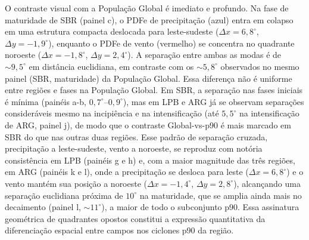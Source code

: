 O contraste visual com a População Global é imediato e profundo. Na fase de maturidade de SBR (painel c), o PDFe de precipitação (azul) entra em colapso em uma estrutura compacta deslocada para leste-sudeste ($\Delta x = 6{,}8^{\circ}$, $\Delta y = -1{,}9^{\circ}$), enquanto o PDFe de vento (vermelho) se concentra no quadrante noroeste ($\Delta x = -1{,}8^{\circ}$, $\Delta y = 2{,}4^{\circ}$). A separação entre ambas as modas é de ${\sim}9{,}5^{\circ}$ em distância euclidiana, em contraste com os ${\sim}5{,}8^{\circ}$ observados no mesmo painel (SBR, maturidade) da População Global. Essa diferença não é uniforme entre regiões e fases na População Global. Em SBR, a separação nas fases iniciais é mínima (painéis a-b, $0{,}7^{\circ}$--$0{,}9^{\circ}$), mas em LPB e ARG já se observam separações consideráveis mesmo na incipiência e na intensificação (até $5{,}5^{\circ}$ na intensificação de ARG, painel j), de modo que o contraste Global-vs-p90 é mais marcado em SBR do que nas outras duas regiões. Esse padrão de separação cruzada, precipitação a leste-sudeste, vento a noroeste, se reproduz com notória consistência em LPB (painéis g e h) e, com a maior magnitude das três regiões, em ARG (painéis k e l), onde a precipitação se desloca para leste ($\Delta x = 6{,}8^{\circ}$) e o vento mantém sua posição a noroeste ($\Delta x = -1{,}4^{\circ}$, $\Delta y = 2{,}8^{\circ}$), alcançando uma separação euclidiana próxima de $10^{\circ}$ na maturidade, que se amplia ainda mais no decaimento (painel l, ${\sim}11^{\circ}$), a maior de todo o subconjunto p90. Essa assinatura geométrica de quadrantes opostos constitui a expressão quantitativa da diferenciação espacial entre campos nos ciclones p90 da região.

